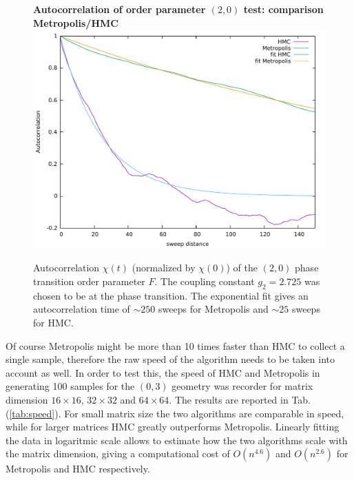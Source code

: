 \begin{figure}[hp]
\centering
\textbf{Autocorrelation of order parameter $(2,0)$ test: comparison Metropolis/HMC}
\includegraphics[width=1\linewidth]{fig/autocorrp2q0.pdf}
\caption{Autocorrelation $\chi (t)$ (normalized by $\chi(0)$) of the $(2,0)$ phase transition order parameter $F$. The coupling constant $g_2 = 2.725$ was chosen to be at the phase transition. The exponential fit gives an autocorrelation time of $\sim 250$ sweeps for Metropolis and $\sim 25$ sweeps for HMC.}
\label{fig:autoc}
\end{figure}
\newline
Of course Metropolis might be more than 10 times faster than HMC to collect a single sample, therefore the raw speed of the algorithm needs to be taken into account as well. In order to test this, the speed of HMC and Metropolis in generating 100 samples for the $(0,3)$ geometry was recorder for matrix dimension $16 \times 16$, $32 \times 32$ and $64 \times 64$. The results are reported in Tab.(\ref{tab:speed}).\newline
For small matrix size the two algorithms are comparable in speed, while for larger matrices HMC greatly outperforms Metropolis. Linearly fitting the data in logaritmic scale allows to estimate how the two algorithms scale with the matrix dimension, giving a computational cost of $O(n^{4.6})$ and $O(n^{2.6})$ for Metropolis and HMC respectively.
